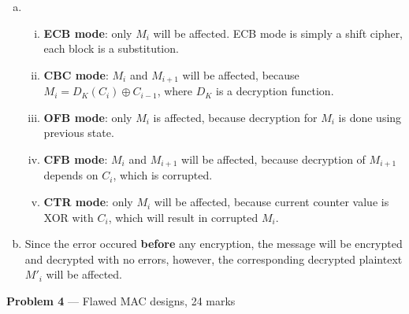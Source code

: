 \documentclass[11pt]{article}
\theoremstyle{definition}
\begin{document}
\begin{enumerate}[a. ]
  \item
    \begin{enumerate}[i. ]
      \item
        \textbf{ECB mode}: only $M_i$ will be affected. ECB mode is simply a shift cipher, each block is a substitution.

      \item
        \textbf{CBC mode}: $M_i$ and $M_{i + 1}$ will be affected, because $M_i = D_K(C_i) \oplus C_{i - 1}$, where $D_K$ is a decryption function.

      \item
        \textbf{OFB mode}: only $M_i$ is affected, because decryption for $M_i$ is done using previous state.

      \item
        \textbf{CFB mode}: $M_i$ and $M_{i + 1}$ will be affected, because decryption of $M_{i + 1}$ depends on $C_i$, which is corrupted.
        
      \item
        \textbf{CTR mode}: only $M_i$ will be affected, because current counter value is XOR with $C_i$, which will result in corrupted $M_i$.
    \end{enumerate}

  \item
    Since the error occured \textbf{before} any encryption, the message will be encrypted and decrypted with no errors, however, the corresponding decrypted plaintext $M'_i$ will be affected.
\end{enumerate}

\newpage

\item[] \textbf{Problem 4} --- Flawed MAC designs, 24 marks
\end{document}
